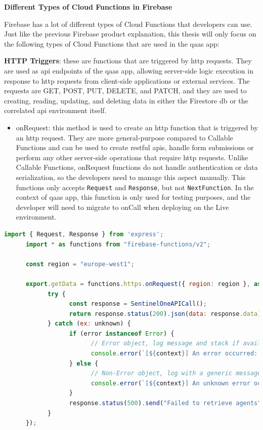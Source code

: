 \textbf{Different Types of Cloud Functions in Firebase}

Firebase has a lot of different types of Cloud Functions that developers can use. Just like the previous Firebase product
explanation, this thesis will only focus on the following types of Cloud Functions that are used in the \acrshort{qaas} app:

\textbf{HTTP Triggers}: these are functions that are triggered by \acrshort{http} requests. They are used as \acrshort{api}
endpoints of the \acrshort{qaas} app, allowing server-side logic execution in response to \acrshort{http} requests from
client-side applications or external services. The requests are GET, POST, PUT, DELETE, and PATCH, and they are used to
creating, reading, updating, and deleting data in either the Firestore \acrshort{db} or the correlated \acrshort{api}
environment itself.

\begin{itemize}
      \item onRequest: this method is used to create an \acrshort{http} function that is triggered by an \acrshort{http}
            request. They are more general-purpose compared to Callable Functions and can be used to create \acrshort{rest}ful
            \acrshort{api}s, handle form submissions or perform any other server-side operations that require \acrshort{http}
            requests. Unlike Callable Functions, onRequest functions do not handle authentication or data serialization, so
            the developers need to manage this aspect manually. This functions only accepts \texttt{Request} and
            \texttt{Response}, but not \texttt{NextFunction}. In the context of \acrshort{qaas} app, this function is only used
            for testing purposes, and the developer will need to migrate to onCall when deploying on the Live environment.
\end{itemize}

\begin{lstlisting}[language=JavaScript, caption=Example of a typical onRequest function]
      import { Request, Response } from 'express';
      import * as functions from "firebase-functions/v2";

      const region = "europe-west1";

      export.getData = functions.https.onRequest({ region: region }, async (request: Request, response: Response): Promise<any> => {
            try {
                  const response = SentinelOneAPICall();
                  return response.status(200).json(data: response.data);
            } catch (ex: unknown) {
                  if (error instanceof Error) {
                        // Error object, log message and stack if available
                        console.error(`[${context}] An error occurred: ${error.message} \n Stack: ${error.stack}`);
                  } else {
                        // Non-Error object, log with a generic message.
                        console.error(`[${context}] An unknown error occurred:`, error);
                  }
                  response.status(500).send("Failed to retrieve agents");
            }
      });
\end{lstlisting}

